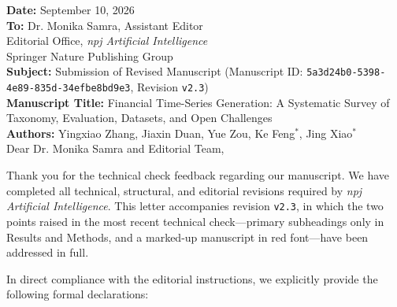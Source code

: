 \documentclass[11pt,a4paper]{article}
\begin{document}
\noindent\textbf{Date:} September 10, 2026\\[0.5em]
\noindent\textbf{To:} Dr. Monika Samra, Assistant Editor\\
Editorial Office, \textit{npj Artificial Intelligence}\\
Springer Nature Publishing Group\\[1.5em]

\noindent\textbf{Subject:} Submission of Revised Manuscript (Manuscript ID: \texttt{5a3d24b0-5398-4e89-835d-34efbe8bd9e3}, Revision \texttt{v2.3})\\[0.5em]
\noindent\textbf{Manuscript Title:} Financial Time-Series Generation: A Systematic Survey of Taxonomy, Evaluation, Datasets, and Open Challenges\\[0.5em]
\noindent\textbf{Authors:} Yingxiao Zhang, Jiaxin Duan, Yue Zou, Ke Feng$^*$, Jing Xiao$^*$\\[1.5em]

\noindent Dear Dr. Monika Samra and Editorial Team,

\vspace{0.8em}
\noindent Thank you for the technical check feedback regarding our manuscript. We have completed all technical, structural, and editorial revisions required by \textit{npj Artificial Intelligence}. This letter accompanies revision \texttt{v2.3}, in which the two points raised in the most recent technical check---primary subheadings only in Results and Methods, and a marked-up manuscript in red font---have been addressed in full.

\vspace{0.8em}
\noindent In direct compliance with the editorial instructions, we explicitly provide the following formal declarations:
\end{document}
